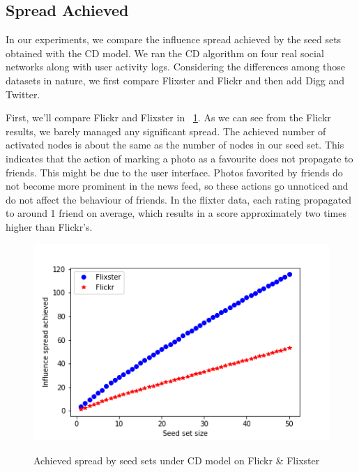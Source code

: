 \documentclass{acm_proc_article-sp}
\begin{document}
\subsection*{Spread Achieved}
In our experiments, we compare the influence spread achieved by the seed sets obtained with the CD model. We ran the CD algorithm on four real social networks along with user activity logs. Considering the differences among those datasets in nature, we first compare Flixster and Flickr and then add Digg and Twitter.

First, we'll compare Flickr and Flixster in  ~\ref{spread2}. As we can see from the Flickr results, we barely managed any significant spread. The achieved number of activated nodes is about the same as the number of nodes in our seed set. This indicates that the action of marking a photo as a favourite does not propagate to friends. This might be due to the user interface. Photos favorited by friends do not become more prominent in the news feed, so these actions go unnoticed and do not affect the behaviour of friends. In the flixter data, each rating propagated to around 1 friend on average, which results in a score approximately two times higher than Flickr's.

\begin{figure}[h]
	\includegraphics[width=\linewidth]{spread2.png}
	\centering
	\label{spread2}
	\caption{Achieved spread by seed sets under CD model on Flickr \& Flixster}
\end{figure}
\end{document}
